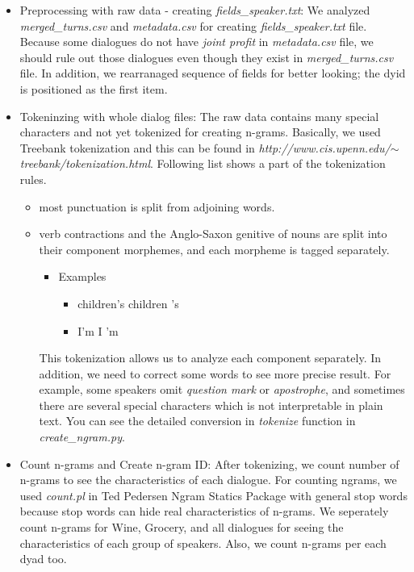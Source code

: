 \documentclass[11pt]{article} %
\begin{document}
\begin{itemize}
\item Preprocessing with raw data - creating \textit{fields\_speaker.txt}: \newline
We analyzed \textit{merged\_turns.csv} and \textit{metadata.csv} for creating \textit{fields\_speaker.txt} file. Because some dialogues do not have \textit{joint profit} in \textit{metadata.csv} file, we should rule out those dialogues even though they exist in \textit{merged\_turns.csv} file. In addition, we rearranaged sequence of fields for better looking; the dyid is positioned as the first item.

\item Tokeninzing with whole dialog files: \newline
The raw data contains many special characters and not yet tokenized for creating n-grams. Basically, we used Treebank tokenization and this can be found in \textit{http://www.cis.upenn.edu/$\sim$treebank/tokenization.html}. Following list shows a part of the tokenization rules.
\begin{itemize}
\item most punctuation is split from adjoining words.
\item verb contractions and the Anglo-Saxon genitive of nouns are split into their component morphemes, and each morpheme is tagged separately.
\begin{itemize}
\item Examples
\begin{itemize}
\item children's \textrightarrow children 's
\item I'm \textrightarrow I 'm
\end{itemize}
\end{itemize}
This tokenization allows us to analyze each component separately.\newline
In addition, we need to correct some words to see more precise result. For example, some speakers omit \textit{question mark} or \textit{apostrophe}, and sometimes there are several special characters which is not interpretable in plain text. You can see the detailed conversion in \textit{tokenize} function in \textit{create\_ngram.py}.
\end{itemize}
\item Count n-grams and Create n-gram ID:\newline
After tokenizing, we count number of n-grams to see the characteristics of each dialogue. For counting ngrams, we used \textit{count.pl} in Ted Pedersen Ngram Statics Package with general stop words because stop words can hide real characteristics of n-grams. We seperately count n-grams for Wine, Grocery, and all dialogues for seeing the characteristics of each group of speakers. Also, we count n-grams per each dyad too. \newline

\end{itemize}
\end{document}
